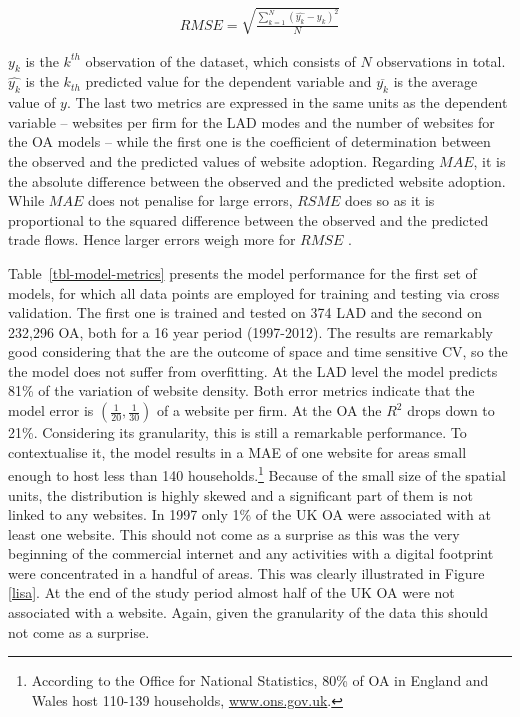 \documentclass[
  authoryear,
  preprint,
  3p]{elsarticle}
\begin{document}
\begin{align}
RMSE =  \sqrt{\frac{\sum_{k = 1}^{N} (\hat{y_{k}} - y_{k})^2} {N}} \label{eq:rmse}
\end{align}

\(y_{k}\) is the \(k^{th}\) observation of the dataset, which consists
of \(N\) observations in total. \(\hat{y_{k}}\) is the \(k_{th}\)
predicted value for the dependent variable and \(\overline{y_{k}}\) is
the average value of \(y\). The last two metrics are expressed in the
same units as the dependent variable -- websites per firm for the LAD
modes and the number of websites for the OA models -- while the first
one is the coefficient of determination between the observed and the
predicted values of website adoption. Regarding \(MAE\), it is the
absolute difference between the observed and the predicted website
adoption. While \(MAE\) does not penalise for large errors, \(RSME\)
does so as it is proportional to the squared difference between the
observed and the predicted trade flows. Hence larger errors weigh more
for \(RMSE\) \citep{pontius2008components}.

Table~\ref{tbl-model-metrics} presents the model performance for the
first set of models, for which all data points are employed for training
and testing via cross validation. The first one is trained and tested on
374 LAD and the second on 232,296 OA, both for a 16 year period
(1997-2012). The results are remarkably good considering that the are
the outcome of space and time sensitive CV, so the the model does not
suffer from overfitting. At the LAD level the model predicts 81\% of the
variation of website density. Both error metrics indicate that the model
error is \((\frac{1}{20}, \frac{1}{30})\) of a website per firm. At the
OA the \(R^2\) drops down to 21\%. Considering its granularity, this is
still a remarkable performance. To contextualise it, the model results
in a MAE of one website for areas small enough to host less than 140
households.\footnote{According to the Office for National Statistics,
  80\% of OA in England and Wales host 110-139 households,
  \href{https://www.ons.gov.uk/census/2001censusandearlier/dataandproducts/outputgeography/outputareas}{www.ons.gov.uk}.}
Because of the small size of the spatial units, the distribution is
highly skewed and a significant part of them is not linked to any
websites. In 1997 only 1\% of the UK OA were associated with at least
one website. This should not come as a surprise as this was the very
beginning of the commercial internet and any activities with a digital
footprint were concentrated in a handful of areas. This was clearly
illustrated in Figure \ref{lisa}. At the end of the study period almost
half of the UK OA were not associated with a website. Again, given the
granularity of the data this should not come as a surprise.
\end{document}
